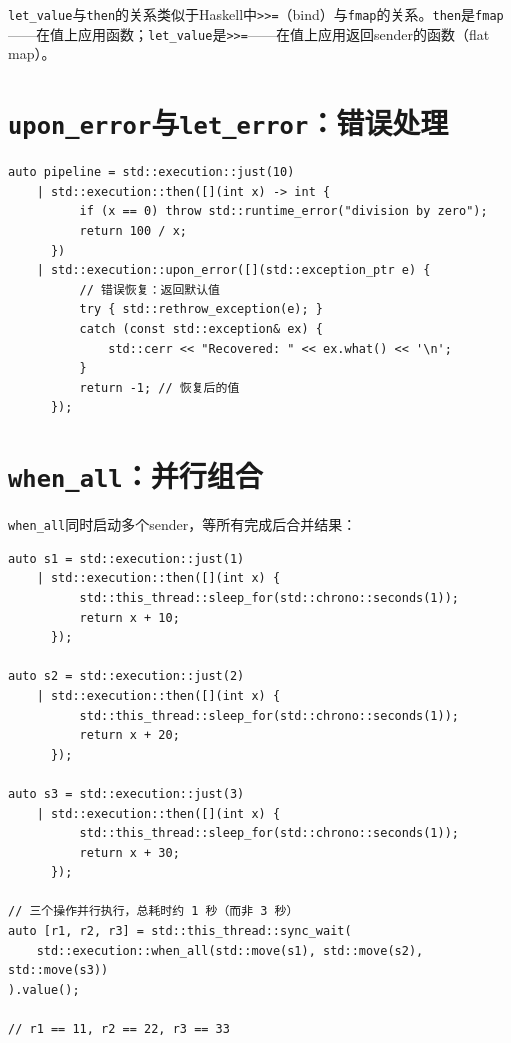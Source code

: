 \documentclass[12pt,a4paper,fontset=fandol]{ctexbook}
\begin{document}
\begin{note}
\texttt{let\_value}与\texttt{then}的关系类似于Haskell中\texttt{>>=}（bind）与\texttt{fmap}的关系。\texttt{then}是\texttt{fmap}——在值上应用函数；\texttt{let\_value}是\texttt{>>=}——在值上应用返回sender的函数（flat map）。
\end{note}

\section{\texttt{upon\_error}与\texttt{let\_error}：错误处理}

\begin{lstlisting}
auto pipeline = std::execution::just(10)
    | std::execution::then([](int x) -> int {
          if (x == 0) throw std::runtime_error("division by zero");
          return 100 / x;
      })
    | std::execution::upon_error([](std::exception_ptr e) {
          // 错误恢复：返回默认值
          try { std::rethrow_exception(e); }
          catch (const std::exception& ex) {
              std::cerr << "Recovered: " << ex.what() << '\n';
          }
          return -1; // 恢复后的值
      });
\end{lstlisting}

\section{\texttt{when\_all}：并行组合}

\texttt{when\_all}同时启动多个sender，等所有完成后合并结果：

\begin{lstlisting}
auto s1 = std::execution::just(1)
    | std::execution::then([](int x) {
          std::this_thread::sleep_for(std::chrono::seconds(1));
          return x + 10;
      });

auto s2 = std::execution::just(2)
    | std::execution::then([](int x) {
          std::this_thread::sleep_for(std::chrono::seconds(1));
          return x + 20;
      });

auto s3 = std::execution::just(3)
    | std::execution::then([](int x) {
          std::this_thread::sleep_for(std::chrono::seconds(1));
          return x + 30;
      });

// 三个操作并行执行，总耗时约 1 秒（而非 3 秒）
auto [r1, r2, r3] = std::this_thread::sync_wait(
    std::execution::when_all(std::move(s1), std::move(s2), std::move(s3))
).value();

// r1 == 11, r2 == 22, r3 == 33
\end{lstlisting}
\end{document}

